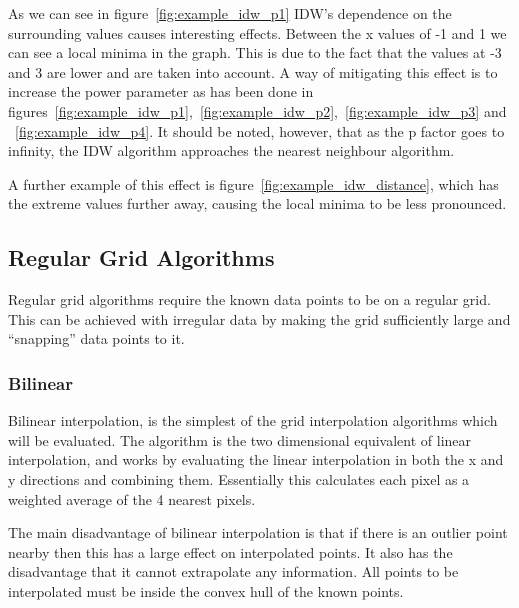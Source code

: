             As we can see in figure~\ref{fig:example_idw_p1} IDW's dependence on the surrounding values causes interesting effects. Between the x values of -1 and 1 we can see a local minima in the graph. This is due to the fact that the values at -3 and 3 are lower and are taken into account. A way of mitigating this effect is to increase the power parameter as has been done in figures~\ref{fig:example_idw_p1},~\ref{fig:example_idw_p2},~\ref{fig:example_idw_p3} and ~\ref{fig:example_idw_p4}. It should be noted, however, that as the p factor goes to infinity, the IDW algorithm approaches the nearest neighbour algorithm. 

            A further example of this effect is figure~\ref{fig:example_idw_distance}, which has the extreme values further away, causing the local minima to be less pronounced.



    \subsection{Regular Grid Algorithms}\label{background_interpolation_methods_regulargrid}

        Regular grid algorithms require the known data points to be on a regular grid. This can be achieved with irregular data by making the grid sufficiently large and ``snapping'' data points to it.

        \subsubsection{Bilinear}\label{background_interpolation_methods_bilinear}

            Bilinear interpolation, is the simplest of the grid interpolation algorithms which will be evaluated. The algorithm is the two dimensional equivalent of linear interpolation, and works by evaluating the linear interpolation in both the x and y directions and combining them. Essentially this calculates each pixel as a weighted average of the 4 nearest pixels.

            The main disadvantage of bilinear interpolation is that if there is an outlier point nearby then this has a large effect on interpolated points. It also has the disadvantage that it cannot extrapolate any information. All points to be interpolated must be inside the convex hull of the known points.


